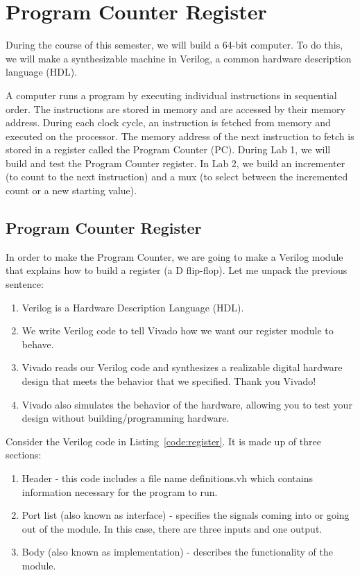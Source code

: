 \chapter{Program Counter Register}

During the course of this semester, we will build a 64-bit computer.  To do this, we will make a synthesizable machine in Verilog, a common hardware description language (HDL).  

A computer runs a program by executing individual instructions in sequential order.  The instructions are stored in memory and are accessed by their memory address.  During each clock cycle, an instruction is fetched from memory and executed on the processor.  The memory address of the next instruction to fetch is stored in a register called the Program Counter (PC).  During Lab 1, we will build and test the Program Counter register.  In Lab 2, we build an incrementer (to count to the next instruction) and a mux (to select between the incremented count or a new starting value).   

\section{Program Counter Register}

In order to make the Program Counter, we are going to make a Verilog module that explains how to build a register (a D flip-flop).  Let me unpack the previous sentence:
\begin{enumerate}
	\item Verilog is a Hardware Description Language (HDL).
	\item We write Verilog code to tell Vivado how we want our register module to behave.
	\item Vivado reads our Verilog code and synthesizes a realizable digital hardware design that meets the behavior that we specified.  Thank you Vivado!
	\item Vivado also simulates the behavior of the hardware, allowing you to test your design without building/programming hardware.
\end{enumerate}   
Consider the Verilog code in Listing~\ref{code:register}.  It is made up of three sections: 
\begin{enumerate}
	\item Header - this code includes a file name definitions.vh which contains information necessary for the program to run.
	\item Port list (also known as interface) - specifies the signals coming into or going out of the module.  In this case, there are three inputs and one output.
	\item Body (also known as implementation) - describes the functionality of the module.
\end{enumerate}

